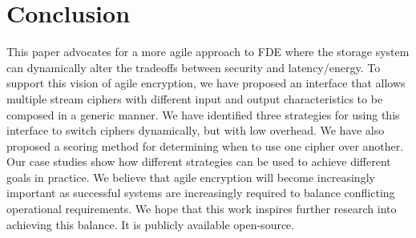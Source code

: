 \section{Conclusion} \label{sec:conclusion} This paper advocates for a more agile
approach to FDE where the storage system can dynamically alter the tradeoffs
between security and latency/energy. To support this vision of agile encryption,
we have proposed an interface that allows multiple stream ciphers with different
input and output characteristics to be composed in a generic manner. We have
identified three strategies for using this interface to switch ciphers
dynamically, but with low overhead. We have also proposed a scoring method for
determining when to use one cipher over another. Our case studies show how
different strategies can be used to achieve different goals in practice. We
believe that agile encryption will become increasingly important as successful
systems are increasingly required to balance conflicting operational
requirements. We hope that this work inspires further research into achieving
this balance. It is publicly available open-source.

